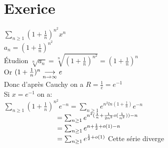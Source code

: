 \documentclass{article}
\author{Frederic Becerril}
\newcommand\tab[1][1cm]{\hspace*{#1}}
\begin{document}
\part*{Exerice}

$\sum_{n \geq 1} (1 + \frac{1}{n})^{n^2} x^n$\\
$a_n = (1 + \frac{1}{n})^{n^2}$\\
Étudion $\sqrt[n]{a_n} = \sqrt[n]{(1 + \frac{1}{n})^{n^2}} = (1 + \frac{1}{n})^n$\\
Or $(1 + \frac{1}{n})^n \mylim e$\\
Donc d'après Cauchy on a $R = \frac{1}{e} = e^{-1}$\\
Si $x = e^{-1}$ on a:\\
$\sum_{n \geq 1} (1 + \frac{1}{n})^{n^2} e^{-n} = \sum_{n \geq 1} e^{n^2 ln(1 + \frac{1}{n})}e^{-n}$\\
$\tab[2.7cm] = \sum_{n \geq 1} e^{n^2 (\frac{1}{n} + \frac{1}{2n^2}o(\frac{1}{n^2})) -n}$\\
$\tab[2.7cm] = \sum_{n \geq 1} e^{n + \frac{1}{2} + o(1) -n}$\\
$\tab[2.7cm] = \sum_{n \geq 1} e^{\frac{1}{2} + o(1)}$ Cette série diverge
\end{document}
